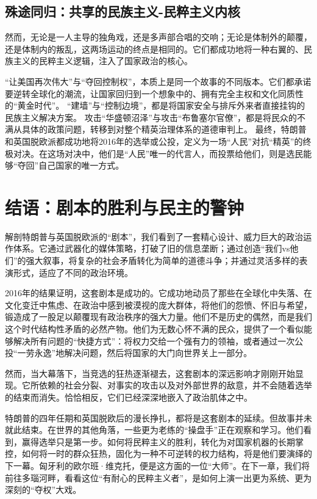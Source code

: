 \subsection{殊途同归：共享的民族主义-民粹主义内核}

然而，无论是一人主导的独角戏，还是多声部合唱的交响；无论是体制外的颠覆，还是体制内的叛乱，这两场运动的终点是相同的。它们都成功地将一种右翼的、民族主义的民粹主义逻辑，注入了国家政治的核心。

“让美国再次伟大”与“夺回控制权”，本质上是同一个故事的不同版本。它们都承诺要逆转全球化的潮流，让国家回归到一个想象中的、拥有完全主权和文化同质性的“黄金时代”。
“建墙”与“控制边境”，都是将国家安全与排斥外来者直接挂钩的民族主义解决方案。
攻击“华盛顿沼泽”与攻击“布鲁塞尔官僚”，都是将民众的不满从具体的政策问题，转移到对整个精英治理体系的道德审判上。
最终，特朗普和英国脱欧派都成功地将2016年的选举或公投，定义为一场“人民”对抗“精英”的终极对决。在这场对决中，他们是“人民”唯一的代言人，而投票给他们，则是选民能够“夺回”自己国家的唯一方式。

\section{结语：剧本的胜利与民主的警钟}

解剖特朗普与英国脱欧派的“剧本”，我们看到了一套精心设计、威力巨大的政治运作体系。它通过武器化的媒体策略，打破了旧的信息垄断；通过创造“我们vs他们”的强大叙事，将复杂的社会矛盾转化为简单的道德斗争；并通过灵活多样的表演形式，适应了不同的政治环境。

2016年的结果证明，这套剧本是成功的。它成功地动员了那些在全球化中失落、在文化变迁中焦虑、在政治中感到被漠视的庞大群体，将他们的怨愤、怀旧与希望，锻造成了一股足以颠覆现有政治秩序的强大力量。他们不是历史的偶然，而是我们这个时代结构性矛盾的必然产物。他们为无数心怀不满的民众，提供了一个看似能够解决所有问题的“快捷方式”：将权力交给一个强有力的领袖，或者通过一次公投“一劳永逸”地解决问题，然后将国家的大门向世界关上一部分。

然而，当大幕落下，当竞选的狂热逐渐褪去，这套剧本的深远影响才刚刚开始显现。它所依赖的社会分裂、对事实的攻击以及对外部世界的敌意，并不会随着选举的结束而消失。恰恰相反，它们已经深深地嵌入了政治肌体之中。

特朗普的四年任期和英国脱欧后的漫长挣扎，都将是这套剧本的延续。但故事并未就此结束。在世界的其他角落，一些更为老练的“操盘手”正在观察和学习。他们看到，赢得选举只是第一步。如何将民粹主义的胜利，转化为对国家机器的长期掌控，如何将一时的群众狂热，固化为一种不可逆转的权力结构，将是他们要演绎的下一幕。匈牙利的欧尔班·维克托，便是这方面的一位“大师”。在下一章，我们将前往多瑙河畔，看看这位“有耐心的民粹主义者”，是如何上演一出更为系统、更为深刻的“夺权”大戏。